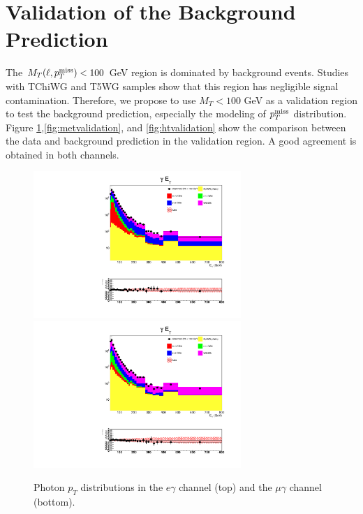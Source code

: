 \documentclass[thesis.tex]{subfiles}
\renewcommand\_{\textunderscore\allowbreak}
\begin{document}
\section{Validation of the Background Prediction}

The $M_T(\ell,p_T^\textrm{miss}) < 100$ GeV region is dominated by background events. Studies with TChiWG and T5WG samples show that this region has negligible signal contamination. Therefore, we propose to use $M_T < 100$ GeV as a validation region to test the background prediction, especially the modeling of $p_T^\textrm{miss}$ distribution. Figure \ref{fig:etvalidation},\ref{fig:metvalidation}, and \ref{fig:htvalidation} show the comparison between the data and background prediction in the validation region. A good agreement is obtained in both channels.

\begin{figure}[hbtp]
  \centering
    \includegraphics[width=0.7\textwidth]{Figures/VALID_egamma_2016ReMiniAOD_pt.pdf} \\
    \includegraphics[width=0.7\textwidth]{Figures/VALID_mg_2016ReMiniAOD_pt.pdf} 
  \caption{Photon $p_T$ distributions in the $e\gamma$ channel (top) and the $\mu\gamma$ channel (bottom).}
    \label{fig:etvalidation}
\end{figure}
\end{document}
